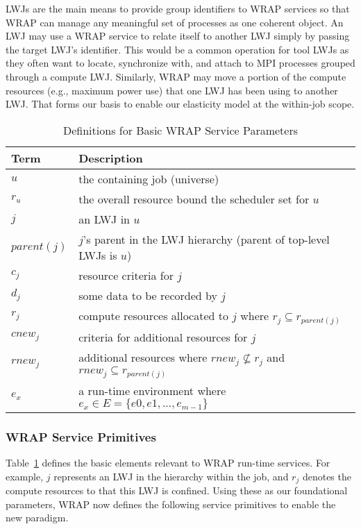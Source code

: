 LWJs are the main means to provide group identifiers to WRAP services
so that WRAP can manage any meaningful set of processes as one coherent object. 
An LWJ may use a WRAP service to relate itself 
to another LWJ simply by passing the target LWJ's identifier.
This would be a common operation for tool LWJs as they often want to 
locate, synchronize with, and attach to MPI processes grouped through a compute LWJ.
Similarly, WRAP may move a portion of the compute resources (e.g., maximum power use) 
that one LWJ has been using to another LWJ. That forms our basis to enable 
our elasticity model at the within-job scope.


\begin{table}
\centering
\begin{tabular}{|l|l|}
\hline
Term & Description \\
\hline
$u$ & the containing job (universe) \\
$r_u$ & the overall resource bound the scheduler set for $u$ \\
$j$ & an LWJ in $u$ \\
$parent(j)$ & $j$'s parent in the LWJ hierarchy (parent of top-level LWJs is $u$) \\
$c_j$ & resource criteria for $j$ \\
$d_j$ & some data to be recorded by $j$ \\
$r_j$ & compute resources allocated to $j$ where $r_j \subseteq r_{parent(j)}$ \\
$cnew_j$ & criteria for additional resources for $j$ \\
$rnew_j$ & additional resources where $rnew_j \not\subseteq r_j$ and $rnew_j \subseteq r_{parent(j)}$ \\
$e_x$ & a run-time environment where $e_x \in E = \{e0, e1, ..., e_{m-1}\}$ \\
\hline
\end{tabular}
\caption{Definitions for Basic WRAP Service Parameters}
\label{tab:def}
\end{table}

\subsubsection{WRAP Service Primitives}
\label{sect:prim}

Table~\ref{tab:def} defines the basic elements relevant to WRAP run-time services.
For example, $j$ represents an LWJ in the hierarchy within the job, and 
$r_j$ denotes the compute resources to that this LWJ is confined.
Using these as our foundational parameters, WRAP now defines
the following service primitives to enable the new paradigm.


